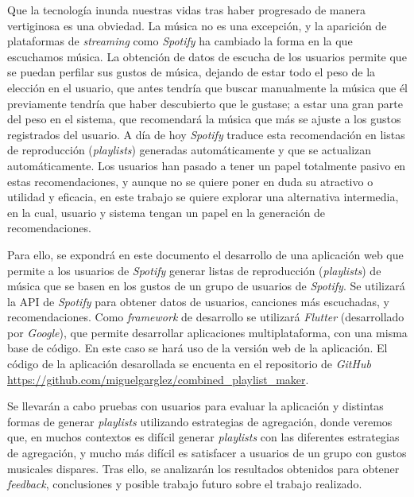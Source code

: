 Que la tecnología inunda nuestras vidas tras haber progresado de manera vertiginosa es una obviedad.
La música no es una excepción, y la aparición de plataformas de \textit{streaming} como \textit{Spotify} ha cambiado la forma en la que escuchamos música.
La obtención de datos de escucha de los usuarios permite que se puedan perfilar sus gustos de música, dejando de estar todo el peso 
de la elección en el usuario, que antes tendría que buscar manualmente la música que él previamente tendría 
que haber descubierto que le gustase; a estar una gran parte del peso en el sistema, que recomendará la música 
que más se ajuste a los gustos registrados del usuario. A día de hoy \textit{Spotify} traduce esta recomendación en listas de reproducción (\textit{playlists})
generadas automáticamente y que se actualizan automáticamente. Los usuarios han pasado a tener un papel totalmente pasivo en estas recomendaciones, y
aunque no se quiere poner en duda su atractivo o utilidad y eficacia, en este trabajo se quiere explorar una alternativa intermedia, en la cual, usuario y sistema
tengan un papel en la generación de recomendaciones.

Para ello, se expondrá en este documento el desarrollo de una aplicación web que permite a los usuarios de \textit{Spotify}
generar listas de reproducción (\textit{playlists}) de música que se basen en los gustos de un grupo de usuarios de \textit{Spotify}. Se utilizará la API de \textit{Spotify}
para obtener datos de usuarios, canciones más escuchadas, y recomendaciones. Como \textit{framework} de desarrollo se utilizará \textit{Flutter} (desarrollado por \textit{Google}), que permite desarrollar aplicaciones
multiplataforma, con una misma base de código. En este caso se hará uso de la versión web de la aplicación. El código de la aplicación desarollada se encuenta en el repositorio de \textit{GitHub} 
\url{https://github.com/miguelgarglez/combined_playlist_maker}.

Se llevarán a cabo pruebas con usuarios para evaluar la aplicación y distintas formas de generar \textit{playlists} utilizando estrategias de agregación, donde veremos que, en muchos contextos 
es difícil generar \textit{playlists} con las diferentes estrategias de agregación, y mucho más difícil es satisfacer a usuarios de un grupo con gustos musicales dispares.
Tras ello, se analizarán los resultados obtenidos para obtener \textit{feedback}, conclusiones y posible trabajo futuro sobre el trabajo realizado. 

